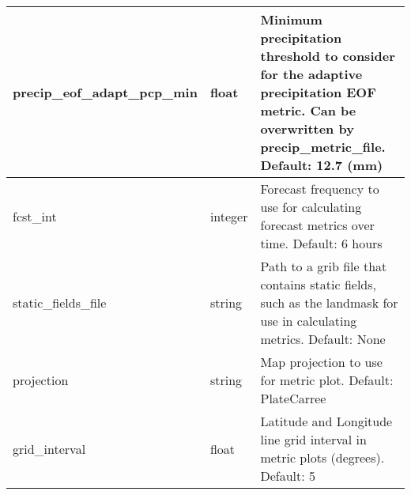 \documentclass[psfig,12pt]{article}
\begin{document}
\begin{table}[H]
\begin{center}
\begin{tabular}{|p{1.75in}|p{0.5in}|p{4.00in}|}
precip\_eof\_adapt\_pcp\_min & float & Minimum precipitation threshold to consider for the adaptive 
precipitation EOF metric.  Can be overwritten by precip\_metric\_file.  Default:  12.7 (mm) \\ \hline

fcst\_int & integer & Forecast frequency to use for calculating forecast metrics over time.
Default: 6 hours \\ \hline

static\_fields\_file & string & Path to a grib file that contains static fields, such as the landmask
for use in calculating metrics.  Default:  None \\ \hline

projection & string & Map projection to use for metric plot.  Default:  PlateCarree \\ \hline

grid\_interval & float & Latitude and Longitude line grid interval in metric plots (degrees).  Default:  5 \\ \hline

\end{tabular}
\end{center}
\end{table}
\end{document}
